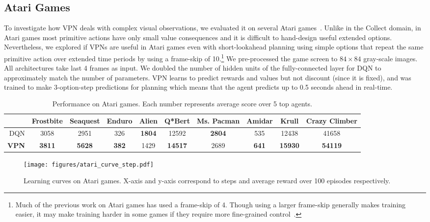 \documentclass{article}
\newcommand{\cutsubsectiondown}{\vspace*{-0.03in}}
\begin{document}
\subsection{Atari Games} \label{exp:atari}
\cutsubsectiondown
To investigate how VPN deals with complex visual observations, we evaluated it on several Atari games~\cite{bellemare2012arcade}. 
Unlike in the Collect domain, in Atari games most primitive actions have only small value consequences and it is difficult to hand-design useful extended options. 
Nevertheless, we explored if VPNs are useful in Atari games even with short-lookahead planning using simple options that repeat the same primitive action over extended time periods by using a frame-skip of 10.\footnote{Much of the previous work on Atari games has used a frame-skip of 4. Though using a larger frame-skip generally makes training easier, it may make training harder in some games if they require more fine-grained control~\citep{Lakshminarayanan2017DynamicAR}.} 
We pre-processed the game screen to $84 \times 84$ gray-scale images. All architectures take last 4 frames as input. We doubled the number of hidden units of the fully-connected layer for DQN to approximately match the number of parameters. 
VPN learns to predict rewards and values but not discount (since it is fixed), and was trained to make 3-option-step predictions for planning which means that the agent predicts up to 0.5 seconds ahead in real-time.

\begin{table}[t]
  \small
  \setlength{\tabcolsep}{3pt}
  \caption{Performance on Atari games. Each number represents average score over 5 top agents. }
  \label{tab:atari}
  \centering
  \begin{tabular}{rccccccccc}
    \toprule
    & Frostbite & Seaquest & Enduro & Alien & Q*Bert & Ms. Pacman & Amidar & Krull & Crazy Climber \\
    \midrule
    DQN 			& 3058  & 2951 & 326 & \textbf{1804} & 12592 & \textbf{2804} & 535 & 12438 & 41658 \\
    \textbf{VPN}	& \textbf{3811} & \textbf{5628} & \textbf{382} & 1429 & \textbf{14517} & 2689 & \textbf{641} & \textbf{15930} & \textbf{54119}  \\
    \bottomrule
  \end{tabular}
\end{table}

\begin{figure}[t]
	\centering
	\texttt{[image: figures/atari\_curve\_step.pdf]}  
	\vspace{-5pt}
	\caption{Learning curves on Atari games. X-axis and y-axis correspond to steps and average reward over 100 episodes respectively. } 
\label{fig:atari}
\end{figure}
\end{document}
